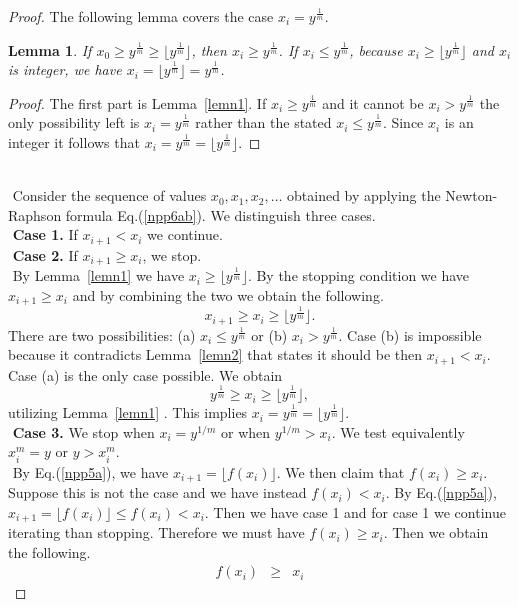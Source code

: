 \documentclass[11pt]{article}
\newtheorem{lem}{Lemma}
\newcommand{\floor}[1]{\lfloor #1 \rfloor}
\begin{document}
\begin{proof}
The following lemma covers the case $x_i = y^{\frac{1}{m}}$.
\begin{lem}
\label{lemn3}
If $x_0 \geq y^{\frac{1}{m}} \geq
\floor{ y^{\frac{1}{m}} }$,
then $x_i  \geq  y^{\frac{1}{m}} $.
If $x_i \leq y^{\frac{1}{m}}$, 
because
$x_i \geq \floor{ y^{\frac{1}{m}} }$ and $x_i$ is
integer,
we have $x_i = \floor{ y^{\frac{1}{m}} } = y^{\frac{1}{m}}$.
\end{lem}
\begin{proof}
The first part is Lemma~\ref{lemn1}.
If $x_i \geq  y^{\frac{1}{m}} $ and it cannot be
 $x_i  >    y^{\frac{1}{m}} $ the only possibility
left is
 $x_i  =    y^{\frac{1}{m}} $ rather than the
stated
 $x_i  \leq y^{\frac{1}{m}} $.
Since $x_i$ is an integer it follows that
$x_i = y^{\frac{1}{m}} =\floor{y^{\frac{1}{m}}}$.
\end{proof}
%
%
$ $ \\ $ $
Consider the sequence of values $x_0 , x_1 , x_2 , \ldots$
obtained by applying the
Newton-Raphson formula Eq.(\ref{npp6ab}).
We distinguish three cases.
$ $ \\ $ $
{\bf Case 1.} If $x_{i+1} < x_i$ we continue.
$ $ \\ $ $
{\bf Case 2.}
If $x_{i+1}  \geq   x_i$, we stop.
$ $ \\ $ $
By Lemma~\ref{lemn1} we have $x_i \geq \floor{y^{\frac{1}{m}}}$.
By the stopping condition we have $x_{i+1} \geq x_i$ and by
combining the two we obtain the following.
\[
x_{i+1} \geq   x_i \geq \floor{y^{\frac{1}{m}}}.
\]
There are two possibilities:
(a) $ x_i \leq y^{\frac{1}{m}}$
or
(b) $x_i >y^{\frac{1}{m}}$.
Case (b) is impossible because it contradicts Lemma~\ref{lemn2}
that states it should be then $x_{i+1}<x_{i}$.
Case (a) is the only case possible.
We obtain
\[
y^{\frac{1}{m}} \geq x_i \geq \floor{y^{\frac{1}{m}}},
\]
utilizing Lemma~\ref{lemn1} . This implies
$x_i = y^{\frac{1}{m}} = \floor{y^{\frac{1}{m}}}$.
$ $ \\ $ $
{\bf Case 3.} We stop when $x_i = y^{1/m}$ or when $y^{1/m} > x_i$.
We test equivalently $x_i^m = y$ or $y > x_i^m$.
$ $ \\ $ $
By Eq.(\ref{npp5a}), we have
$x_{i+1} = \floor{f(x_i )}$.
We then claim that $f(x_i ) \geq x_i$. Suppose
this is not the case and we have instead
$f(x_i ) < x_i$. By Eq.(\ref{npp5a}),
$x_{i+1} = \floor{f(x_i )} \leq f(x_i ) < x_i$.
Then we have case 1 and for case 1 we continue iterating
than stopping. Therefore we must have $f(x_i ) \geq x_i$.
Then we obtain the following.
\begin{eqnarray}
 f(x_i ) & \geq & x_i

\end{eqnarray}
\end{proof}
\end{document}
